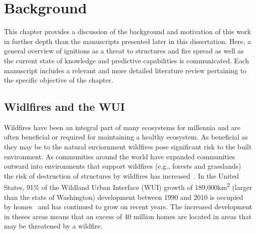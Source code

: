 
\chapter{Background}
\label{part:literature}
    This chapter provides a discussion of the background and motivation of this work in further depth than the manuscripts presented later in this dissertation.  Here, a general overview of ignitions as a threat to structures and fire spread as well as the current state of knowledge and predictive capabilities is communicated. Each manuscript includes a relevant and more detailed literature review pertaining to the specific objective of the chapter. 

\section{Widlfires and the WUI}
    Wildfires have been an integral part of many ecosystems for millennia and are often beneficial or required for maintaining a healthy ecosystem. As beneficial as they may be to the natural enviornment wildfires pose significant risk to the built environment. As communities around the world have expanded communities outward into environments that support wildfires (e.g., forests and grasslands) the risk of destruction of structures by wildfires has increased~\cite{Hammer2009}. In the United States, 91\% of the Wildland Urban Interface (WUI)  growth of 189,000\si{\kilo\meter\squared} (larger than the state of Washington) development between 1990 and 2010 is occupied by homes~\cite{Radeloff2017} and has continued to grow on recent years. The increased development in theses areas means that an excess of 40 million homes are located in areas that may be threatened by a wildfire. 
    

